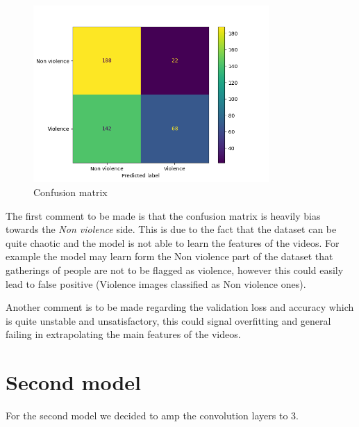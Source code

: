 \begin{figure}[H]
    \centering
    \includegraphics[width=0.8\textwidth]{images/731a-2D3-86ad-conf_matrix.png}
    \caption{Confusion matrix}
    \label{fig:First2DCNNConfusionMatrix}
\end{figure}


The first comment to be made is that the confusion matrix is heavily bias towards the \textit{Non violence} side. This is due to the fact that the dataset can be quite chaotic and the model is not able to learn the features of the videos. For example the model may learn form the Non violence part of the dataset that gatherings of people are not to be flagged as violence, however this could easily lead to false positive (Violence images classified as Non violence ones).

Another comment is to be made regarding the validation loss and accuracy which is quite unstable and unsatisfactory, this could signal overfitting and general failing in extrapolating the main features of the videos.

\section{Second model}
For the second model we decided to amp the convolution layers to 3.

